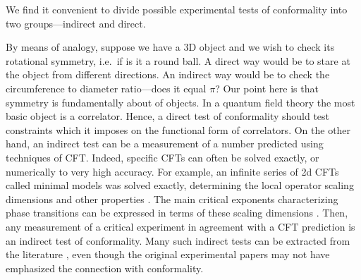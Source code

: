 \documentclass[a4paper,12pt]{article}
\theoremstyle{remark}
\theoremstyle{theorem}
\begin{document}
We find it convenient to divide possible experimental tests of conformality
into two groups---indirect and direct.

By means of analogy, suppose we have a 3D object and we wish to check its
rotational symmetry, i.e.~if is it a round ball. A direct way would be to
stare at the object from different directions. An indirect way would be to
check the circumference to diameter ratio---does it equal $\pi$? Our point here is
that symmetry is fundamentally about  of objects. In
a quantum field theory the most basic object is a correlator. Hence, a direct
test of conformality should test constraints which it imposes on the
functional form of correlators. On the other hand, an indirect test can be a
measurement of a number predicted using techniques of CFT. Indeed, specific CFTs can
often be solved exactly, or numerically to very high accuracy. For example, an
infinite series of 2d CFTs called minimal models was solved exactly,
determining the local operator scaling dimensions and other properties
{\cite{Belavin:1984vu,DiFrancesco:1997nk}}. The main critical exponents
characterizing phase transitions can be expressed in terms of these scaling
dimensions {\cite{cardy1996scaling}}. Then, any measurement of a critical experiment
in agreement with a CFT prediction is an indirect test of conformality. Many
such indirect tests can be extracted from the literature
{\cite{Henkel1999,Rychkov:2025zks}}, even though the original experimental
papers may not have emphasized the connection with conformality.
\end{document}
